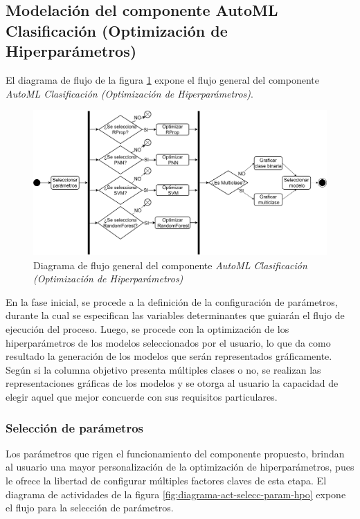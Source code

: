 \subsection{Modelación del componente AutoML Clasificación (Optimización de Hiperparámetros)}
El diagrama de flujo de la figura \ref{fig:diagrama-flujo-gral-comp-hpo} expone el flujo general del componente \textit{AutoML Clasificación (Optimización de Hiperparámetros)}.

\begin{figure}[H]
	\centering
	\includegraphics[width=1\linewidth]{"figuras/capi 2/hpo/diagrama-flujo-gral-comp-hpo"}
	\caption[Diagrama de flujo general del componente AutoML Clasificación (Optimización de Hiperparámetros)]{Diagrama de flujo general del componente \textit{AutoML Clasificación (Optimización de Hiperparámetros)}}
	\label{fig:diagrama-flujo-gral-comp-hpo}
\end{figure}

En la fase inicial, se procede a la definición de la configuración de parámetros, durante la cual se especifican las variables determinantes que guiarán el flujo de ejecución del proceso. Luego, se procede con la optimización de los hiperparámetros de los modelos seleccionados por el usuario, lo que da como resultado la generación de los modelos que serán representados gráficamente. Según si la columna objetivo presenta múltiples clases o no, se realizan las representaciones gráficas de los modelos y se otorga al usuario la capacidad de elegir aquel que mejor concuerde con sus requisitos particulares.

\subsubsection*{Selección de parámetros}
Los parámetros que rigen el funcionamiento del componente propuesto, brindan al usuario una mayor personalización de la optimización de hiperparámetros, pues le ofrece la libertad de configurar múltiples factores claves de esta etapa. El diagrama de actividades de la figura \ref{fig:diagrama-act-selecc-param-hpo} expone el flujo para la selección de parámetros.

